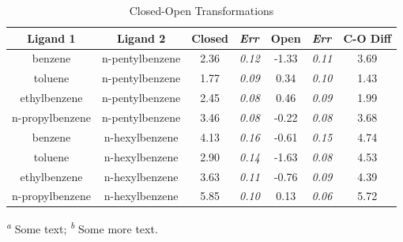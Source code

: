 \documentclass[journal=jctcce,manuscript=article]{achemso}
\begin{document}
\begin{table}[!htb]
\centering
\caption{Closed-Open Transformations}
\label{tbl:C-O}
\begin{tabular}{|c|c|c|l|c|l|c|}
\hline
\textbf{Ligand 1}                       & \textbf{Ligand 2}                       & {\color[HTML]{800080} \textbf{Closed}} & {\color[HTML]{800080} \textit{Err}} & {\color[HTML]{008000} \textbf{Open}} & {\color[HTML]{008000} \textit{Err}} & \textbf{C-O Diff}            \\ \hline
\cellcolor[HTML]{800080}benzene         & \cellcolor[HTML]{008000}n-pentylbenzene & 2.36                                   & \textit{0.12}                       & -1.33                                & \textit{0.11}                       & \cellcolor[HTML]{FFCCC9}3.69 \\ \hline
\cellcolor[HTML]{800080}toluene         & \cellcolor[HTML]{008000}n-pentylbenzene & 1.77                                   & \textit{0.09}                       & 0.34                                 & \textit{0.10}                       & \cellcolor[HTML]{FFCCC9}1.43 \\ \hline
\cellcolor[HTML]{800080}ethylbenzene    & \cellcolor[HTML]{008000}n-pentylbenzene & 2.45                                   & \textit{0.08}                       & 0.46                                 & \textit{0.09}                       & \cellcolor[HTML]{FFCCC9}1.99 \\ \hline
\cellcolor[HTML]{800080}n-propylbenzene & \cellcolor[HTML]{008000}n-pentylbenzene & 3.46                                   & \textit{0.08}                       & -0.22                                & \textit{0.08}                       & \cellcolor[HTML]{FFCCC9}3.68 \\ \hline
\cellcolor[HTML]{800080}benzene         & \cellcolor[HTML]{008000}n-hexylbenzene  & 4.13                                   & \textit{0.16}                       & -0.61                                & \textit{0.15}                       & \cellcolor[HTML]{FFCCC9}4.74 \\ \hline
\cellcolor[HTML]{800080}toluene         & \cellcolor[HTML]{008000}n-hexylbenzene  & 2.90                                   & \textit{0.14}                       & -1.63                                & \textit{0.08}                       & \cellcolor[HTML]{FFCCC9}4.53 \\ \hline
\cellcolor[HTML]{800080}ethylbenzene    & \cellcolor[HTML]{008000}n-hexylbenzene  & 3.63                                   & \textit{0.11}                       & -0.76                                & \textit{0.09}                       & \cellcolor[HTML]{FFCCC9}4.39 \\ \hline
\cellcolor[HTML]{800080}n-propylbenzene & \cellcolor[HTML]{008000}n-hexylbenzene  & 5.85                                   & \textit{0.10}                       & 0.13                                 & \textit{0.06}                       & \cellcolor[HTML]{FFCCC9}5.72 \\ \hline
\end{tabular}

  \textsuperscript{\emph{a}} Some text;
  \textsuperscript{\emph{b}} Some more text.
\end{table}
\end{document}
